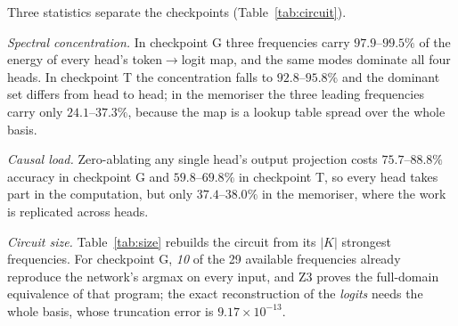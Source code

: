 \documentclass[11pt]{article}
\begin{document}
Three statistics separate the checkpoints (Table~\ref{tab:circuit}).

\emph{Spectral concentration.} In checkpoint G three frequencies carry $97.9$--$99.5\%$ of the energy of every head's token$\to$logit map, and the same modes dominate all four heads. In checkpoint T the concentration falls to $92.8$--$95.8\%$ and the dominant set differs from head to head; in the memoriser the three leading frequencies carry only $24.1$--$37.3\%$, because the map is a lookup table spread over the whole basis.

\emph{Causal load.} Zero-ablating any single head's output projection costs $75.7$--$88.8\%$ accuracy in checkpoint G and $59.8$--$69.8\%$ in checkpoint T, so every head takes part in the computation, but only $37.4$--$38.0\%$ in the memoriser, where the work is replicated across heads.

\emph{Circuit size.} Table~\ref{tab:size} rebuilds the circuit from its $|K|$ strongest frequencies. For checkpoint G, \emph{10} of the 29 available frequencies already reproduce the network's argmax on every input, and Z3 proves the full-domain equivalence of that program; the exact reconstruction of the \emph{logits} needs the whole basis, whose truncation error is $9.17\times10^{-13}$.
\end{document}

